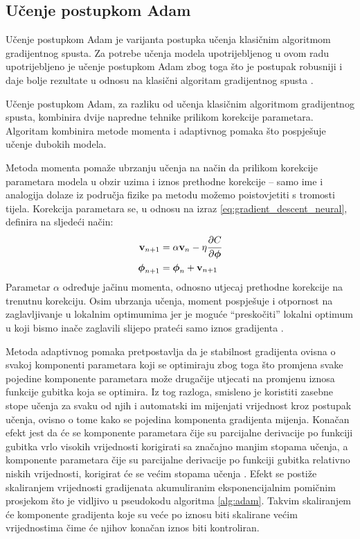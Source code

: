 \documentclass[times, utf8, diplomski, numeric]{fer}
\begin{document}
\subsection{Učenje postupkom Adam}
Učenje postupkom Adam je varijanta postupka učenja klasičnim algoritmom gradijentnog spusta.
Za potrebe učenja modela upotrijebljenog u ovom radu upotrijebljeno je učenje postupkom Adam zbog toga što je postupak robusniji i daje bolje rezultate u odnosu na klasični algoritam gradijentnog spusta \citep{article:adam}. 

Učenje postupkom Adam, za razliku od učenja klasičnim algoritmom gradijentnog spusta, kombinira dvije napredne tehnike prilikom korekcije parametara. 
Algoritam kombinira metode momenta i adaptivnog pomaka što pospješuje učenje dubokih modela.

Metoda momenta pomaže ubrzanju učenja na način da prilikom korekcije parametara modela u obzir uzima i iznos prethodne korekcije -- samo ime i analogija dolaze iz područja fizike pa metodu možemo poistovjetiti s tromosti tijela.
Korekcija parametara se, u odnosu na izraz \ref{eq:gradient_descent_neural}, definira na sljedeći način:
\begin{align}
\mathbf{v}_{n+1} &= \alpha \mathbf{v}_{n} - \eta \cfrac{\partial C}{\partial \boldsymbol{\phi}} \\
 \boldsymbol{\phi}_{n+1} &= \boldsymbol{\phi}_n + \mathbf{v}_{n+1}
\end{align} 
Parametar $\alpha$ određuje jačinu momenta, odnosno utjecaj prethodne korekcije na trenutnu korekciju.
Osim ubrzanja učenja, moment pospješuje i otpornost na zaglavljivanje u lokalnim optimumima jer je moguće ``preskočiti'' lokalni optimum u koji bismo inače zaglavili slijepo prateći samo iznos gradijenta \citep{book:deeplearningbook} \citep{seminar:rela}.

Metoda adaptivnog pomaka pretpostavlja da je stabilnost gradijenta ovisna o svakoj komponenti parametara koji se optimiraju zbog toga što promjena svake pojedine komponente parametara može drugačije utjecati na promjenu iznosa funkcije gubitka koja se optimira.
Iz tog razloga, smisleno je koristiti zasebne stope učenja za svaku od njih i automatski im mijenjati vrijednost kroz postupak učenja, ovisno o tome kako se pojedina komponenta gradijenta mijenja.
Konačan efekt jest da će se komponente parametara čije su parcijalne derivacije po funkciji gubitka vrlo visokih vrijednosti korigirati sa značajno manjim stopama učenja, a komponente parametara čije su parcijalne derivacije po funkciji gubitka relativno niskih vrijednosti, korigirat će se većim stopama učenja \citep{book:deeplearningbook} \citep{seminar:rela}.
Efekt se postiže skaliranjem vrijednosti gradijenata akumuliranim eksponencijalnim pomičnim prosjekom  što je vidljivo u pseudokodu algoritma \ref{alg:adam}. 
Takvim skaliranjem će komponente gradijenta koje su veće po iznosu biti skalirane većim vrijednostima čime će njihov konačan iznos biti kontroliran.
\end{document}
